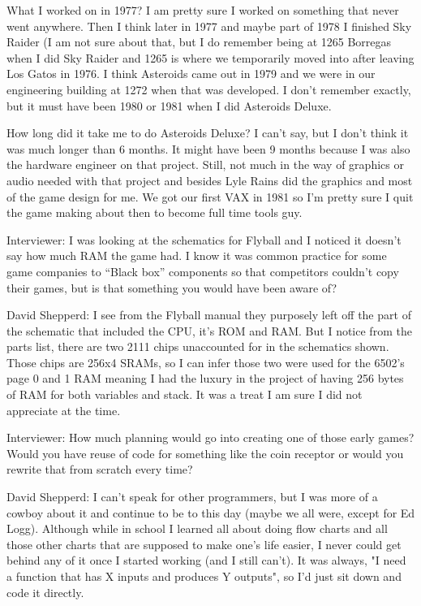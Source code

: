 What I worked on in 1977? I am pretty sure I worked on something that never went anywhere. Then I think later in 1977 and maybe part of 1978 I finished Sky Raider (I am not sure about that, but I do remember being at 1265 Borregas when I did Sky Raider and 1265 is where we temporarily moved into after leaving Los Gatos in 1976. I think Asteroids came out in 1979 and we were in our engineering building at 1272 when that was developed. I don't remember exactly, but it must have been 1980 or 1981 when I did Asteroids Deluxe. 

How long did it take me to do Asteroids Deluxe? I can't say, but I don't think it was much longer than 6 months. It might have been 9 months because I was also the hardware engineer on that project. Still, not much in the way of graphics or audio needed with that project and besides Lyle Rains did the graphics and most of the game design for me. We got our first VAX in 1981 so I'm pretty sure I quit the game making about then to become full time tools guy.

\textcolor{interviewer}{Interviewer:} I was looking at the schematics for Flyball and I noticed it doesn’t say how much RAM the game had. I know it was common practice for some game companies to “Black box” components so that competitors couldn’t copy their games, but is that something you would have been aware of?

\textcolor{interviewee}{David Shepperd:} I see from the Flyball manual they purposely left off the part of the schematic that included the CPU, it's ROM and RAM. But I notice from the parts list, there are two 2111 chips unaccounted for in the schematics shown. Those chips are 256x4 SRAMs, so I can infer those two were used for the 6502's page 0 and 1 RAM meaning I had the luxury in the project of having 256 bytes of RAM for both variables and stack. It was a treat I am sure I did not appreciate at the time. 

\textcolor{interviewer}{Interviewer:} How much planning would go into creating one of those early games? Would you have reuse of code for something like the coin receptor or would you rewrite that from scratch every time?

\textcolor{interviewee}{David Shepperd:} I can't speak for other programmers, but I was more of a cowboy about it and continue to be to this day (maybe we all were, except for Ed Logg). Although while in school I learned all about doing flow charts and all those other charts that are supposed to make one's life easier, I never could get behind any of it once I started working (and I still can't). It was always, "I need a function that has X inputs and produces Y outputs", so I'd just sit down and code it directly. 

